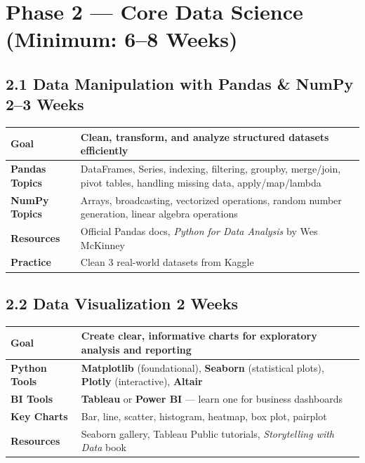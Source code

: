 \documentclass[a4paper,11pt]{article}
\begin{document}
\section{Phase 2 — Core Data Science \hfill \small\normalfont\color{teal}(Minimum: 6--8 Weeks)}

\subsection{2.1 Data Manipulation with Pandas \& NumPy \hfill \small\normalfont\color{darkgray}2--3 Weeks}

\begin{tabular}{>{\bfseries}p{3cm} p{11.5cm}}
\toprule
Goal & Clean, transform, and analyze structured datasets efficiently \\
\midrule
Pandas Topics & DataFrames, Series, indexing, filtering, groupby, merge/join, pivot tables, handling missing data, apply/map/lambda \\
NumPy Topics & Arrays, broadcasting, vectorized operations, random number generation, linear algebra operations \\
Resources & Official Pandas docs, \textit{Python for Data Analysis} by Wes McKinney \\
Practice & Clean 3 real-world datasets from Kaggle \\
\bottomrule
\end{tabular}

\subsection{2.2 Data Visualization \hfill \small\normalfont\color{darkgray}2 Weeks}

\begin{tabular}{>{\bfseries}p{3cm} p{11.5cm}}
\toprule
Goal & Create clear, informative charts for exploratory analysis and reporting \\
\midrule
Python Tools & \textbf{Matplotlib} (foundational), \textbf{Seaborn} (statistical plots), \textbf{Plotly} (interactive), \textbf{Altair} \\
BI Tools & \textbf{Tableau} or \textbf{Power BI} — learn one for business dashboards \\
Key Charts & Bar, line, scatter, histogram, heatmap, box plot, pairplot \\
Resources & Seaborn gallery, Tableau Public tutorials, \textit{Storytelling with Data} book \\
\bottomrule
\end{tabular}
\end{document}
